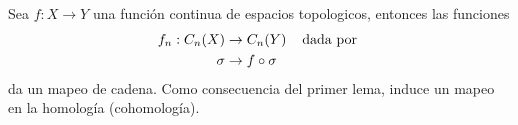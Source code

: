 \documentclass{article}
\begin{document}
\begin{prop}
    Sea $f:X\to Y$ una función continua de espacios topologicos, entonces las funciones
    \begin{align*}
        f_{n}:C_{n}(X) &\to C_{n}(Y)\hspace{4mm}\text{dada por } \\
        \sigma &\to f\circ\sigma
    \end{align*}
    da un mapeo de cadena. Como consecuencia del primer lema, induce un mapeo en la homología 
    (cohomología).
\end{prop}

\end{document}

